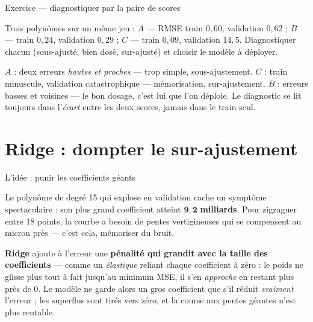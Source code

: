 \documentclass[aspectratio=169,11pt]{beamer}
\begin{document}
\begin{frame}{Exercice — diagnostiquer par la paire de scores}
\begin{ucadrec}[Énoncé]
{\small Trois polynômes sur un même jeu : $A$ — RMSE train $0{,}60$, validation $0{,}62$ ; $B$ — train $0{,}24$, validation $0{,}29$ ; $C$ — train $0{,}09$, validation $14{,}5$. Diagnostiquer chacun (sous-ajusté, bien dosé, sur-ajusté) et choisir le modèle à déployer.}
\end{ucadrec}
\pause
\begin{ucadex}[Correction]
{\small $A$ : deux erreurs \emph{hautes et proches} — trop simple, sous-ajustement. $C$ : train minuscule, validation catastrophique — mémorisation, sur-ajustement. $B$ : erreurs basses et voisines — le bon dosage, c'est lui que l'on déploie. Le diagnostic se lit toujours dans l'\emph{écart} entre les deux scores, jamais dans le train seul.}
\end{ucadex}
\end{frame}


\section[Ridge]{Ridge : dompter le sur-ajustement}

\begin{frame}{L'idée : punir les coefficients géants}
\begin{ucadex}
{\small Le polynôme de degré 15 qui explose en validation cache un symptôme spectaculaire : son plus grand coefficient atteint $\mathbf{9{,}2}$ \textbf{milliards}. Pour zigzaguer entre 18 points, la courbe a besoin de pentes vertigineuses qui se compensent au micron près — c'est cela, mémoriser du bruit.}
\end{ucadex}
\begin{ucaddef}
{\small \textbf{Ridge} ajoute à l'erreur une \textbf{pénalité qui grandit avec la taille des coefficients} — comme un \emph{élastique} reliant chaque coefficient à zéro : le poids ne glisse plus tout à fait jusqu'au minimum MSE, il s'en \emph{approche} en restant plus près de $0$. Le modèle ne garde alors un gros coefficient que s'il réduit \emph{vraiment} l'erreur ; les superflus sont tirés vers zéro, et la course aux pentes géantes n'est plus rentable.}
\end{ucaddef}
\end{frame}
\end{document}
